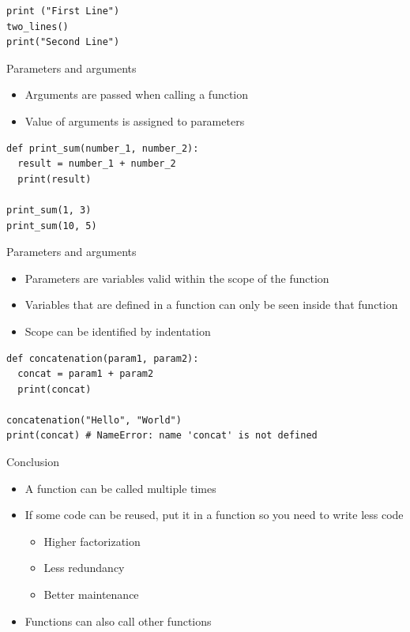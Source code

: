 \documentclass[10pt, a4paper]{beamer} %
\begin{document}
\begin{frame}
\begin{examples}
\begin{lstlisting}
print ("First Line")
two_lines()
print("Second Line")
  \end{lstlisting}
  \end{examples}

  \framebreak
  \begin{block}{Parameters and arguments}
    \begin{itemize}
      \item Arguments are passed when calling a function
      \item Value of arguments is assigned to parameters
    \end{itemize}
    \begin{lstlisting}
def print_sum(number_1, number_2):
  result = number_1 + number_2
  print(result)

print_sum(1, 3)
print_sum(10, 5)
  \end{lstlisting}
  \end{block}
  \begin{block}{Parameters and arguments}
    \framebreak
    \begin{itemize}
      \item Parameters are variables valid within the scope of the function
      \item Variables that are defined in a function can only be seen inside that function
      \item Scope can be identified by indentation
    \end{itemize}
    \begin{lstlisting}
def concatenation(param1, param2):
  concat = param1 + param2
  print(concat)

concatenation("Hello", "World")
print(concat) # NameError: name 'concat' is not defined
  \end{lstlisting}
  \end{block}
  \begin{block}{Conclusion}
    \begin{itemize}
      \item A function can be called multiple times
      \item If some code can be reused, put it in a function so you need to write less code
            \begin{itemize}
              \item Higher factorization
              \item Less redundancy
              \item Better maintenance
            \end{itemize}
      \item Functions can also call other functions
    \end{itemize}
  \end{block}
\end{frame}
\end{document}
